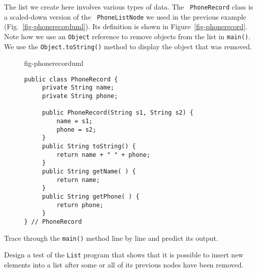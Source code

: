 
The list we create here involves various types of data.  The {\tt
Phone\-Record} class is a scaled-down version of the {\tt
PhoneListNode} we used in the previous example
(Fig.~\ref{fig-phonerecorduml}).  Its definition is shown in
Figure~\ref{fig-phonerecord}.  Note how we use an {\tt Object}
reference to remove objects from the list in {\tt main()}.  We use the
{\tt Object.toString()} method to display the object that was removed.

\begin{figure}[bht]
 {fig-phonerecorduml}
\end{figure}

\begin{figure}[htb]
\jjjprogstart
\begin{jjjlisting}
\begin{lstlisting}
public class PhoneRecord {
     private String name;
     private String phone;

     public PhoneRecord(String s1, String s2) {
         name = s1;
         phone = s2;
     }
     public String toString() {
         return name + " " + phone;
     }
     public String getName( ) {
         return name;
     }
     public String getPhone( ) {
         return phone;
     }
} // PhoneRecord
\end{lstlisting}
\end{jjjlisting}
\end{figure}

\pagebreak
{}
\label{self-study-exercises}
\begin{SSTUDY}

\item  Trace through the {\tt main()} 
method line by line and predict its
output.

\item  Design a test of the {\tt List} program that shows that
it is possible to insert new elements into a list after
some or all of its previous nodes have been removed.
\end{SSTUDY}


